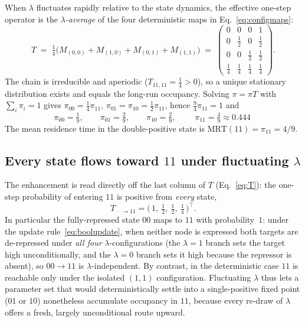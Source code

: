 \documentclass[11pt]{article}
\makeatletter
\providecommand{\DIFaddtex}[1]{{\protect\color{blue}\uwave{#1}}} %
\providecommand{\DIFdeltex}[1]{{\protect\color{red}\sout{#1}}} %
\providecommand{\DIFaddbegin}{} %
\providecommand{\DIFaddend}{} %
\providecommand{\DIFdelbegin}{} %
\providecommand{\DIFdelend}{} %
\providecommand{\DIFadd}[1]{\texorpdfstring{\DIFaddtex{#1}}{#1}} %
\providecommand{\DIFdel}[1]{\texorpdfstring{\DIFdeltex{#1}}{}} %
\providecommand{\DIFscaledelfig}{0.5}
\newlength{\DIFdelgraphicswidth} %
\newlength{\DIFdelgraphicsheight} %
\providecommand{\DIFaddincludegraphics}[2][]{{\color{blue}\fbox{\DIFOincludegraphics[#1]{#2}}}} %
\providecommand{\DIFdelincludegraphics}[2][]{%
\sbox{\DIFdelgraphicsbox}{\DIFOincludegraphics[#1]{#2}}%
\settoboxwidth{\DIFdelgraphicswidth}{\DIFdelgraphicsbox} %
\settoboxtotalheight{\DIFdelgraphicsheight}{\DIFdelgraphicsbox} %
\scalebox{\DIFscaledelfig}{%
\parbox[b]{\DIFdelgraphicswidth}{\usebox{\DIFdelgraphicsbox}\\[-\baselineskip] \rule{\DIFdelgraphicswidth}{0em}}\llap{\resizebox{\DIFdelgraphicswidth}{\DIFdelgraphicsheight}{%
\setlength{\unitlength}{\DIFdelgraphicswidth}%
\begin{picture}(1,1)%
\thicklines\linethickness{2pt} %
{\color[rgb]{1,0,0}\put(0,0){\framebox(1,1){}}}%
{\color[rgb]{1,0,0}\put(0,0){\line( 1,1){1}}}%
{\color[rgb]{1,0,0}\put(0,1){\line(1,-1){1}}}%
\end{picture}%
}\hspace*{3pt}}} %
} %
\DeclareRobustCommand{\DIFaddbegin}{\DIFOaddbegin \let\includegraphics\DIFaddincludegraphics} %
\DeclareRobustCommand{\DIFaddend}{\DIFOaddend \let\includegraphics\DIFOincludegraphics} %
\DeclareRobustCommand{\DIFdelbegin}{\DIFOdelbegin \let\includegraphics\DIFdelincludegraphics} %
\DeclareRobustCommand{\DIFdelend}{\DIFOaddend \let\includegraphics\DIFOincludegraphics} %
\let\sout@orig\sout %
\renewcommand{\sout}[1]{\ifmmode\text{\sout@orig{\ensuremath{#1}}}\else\sout@orig{#1}\fi} %
\makeatother
\begin{document}
When $\lambda$ fluctuates rapidly relative to the state dynamics, the effective
one-step operator is the \emph{$\lambda$-average} of the four deterministic maps
in Eq.~\eqref{eq:configmaps}:
\begin{equation}
  T \;=\; \tfrac{1}{4}\bigl(M_{(0,0)}+M_{(1,0)}+M_{(0,1)}+M_{(1,1)}\bigr)
    \;=\;
    \begin{pmatrix}
      0 & 0 & 0 & 1\\[2pt]
      0 & \tfrac{1}{2} & 0 & \tfrac{1}{2}\\[2pt]
      0 & 0 & \tfrac{1}{2} & \tfrac{1}{2}\\[2pt]
      \tfrac{1}{4} & \tfrac{1}{4} & \tfrac{1}{4} & \tfrac{1}{4}
    \end{pmatrix}.
  \label{eq:T}
\end{equation}
The chain is irreducible and aperiodic ($T_{11,11}=\tfrac14>0$), so a unique
stationary distribution exists and equals the long-run occupancy. Solving
$\pi=\pi T$ with $\sum_i\pi_i=1$ gives $\pi_{00}=\tfrac14\pi_{11}$,
$\pi_{01}=\pi_{10}=\tfrac12\pi_{11}$, hence $\tfrac{9}{4}\pi_{11}=1$ and
\begin{equation}
  \pi_{00}=\tfrac{1}{9},\qquad
  \pi_{01}=\tfrac{2}{9},\qquad
  \pi_{10}=\tfrac{2}{9},\qquad
  \boxed{\;\pi_{11}=\tfrac{4}{9}\approx 0.444\;}
  \label{eq:piann}
\end{equation}
The mean residence time in the double-positive state is
\DIFdelbegin \DIFdel{$\mathrm{MRT}(11)=\pi_{11}=4/9$}\DIFdelend \DIFaddbegin \DIFadd{$\mathrm{occupancy}(11)=\pi_{11}=4/9$}\DIFaddend .

\subsection{Every state flows toward $11$ under fluctuating $\lambda$}
\label{sec:column}

The enhancement is read directly off the last column of $T$
(Eq.~\eqref{eq:T}): the one-step probability of entering $11$ is positive from
\emph{every} state,
\begin{equation}
  T_{\,\cdot\,\to 11} = \bigl(\,1,\ \tfrac12,\ \tfrac12,\ \tfrac14\,\bigr)^{\!\top}.
\end{equation}
In particular the fully-repressed state $00$ maps to $11$ with probability~$1$:
under the update rule~\eqref{eq:boolupdate}, when neither node is expressed both
targets are de-repressed under \emph{all four} $\lambda$-configurations (the
$\lambda=1$ branch sets the target high unconditionally, and the $\lambda=0$
branch sets it high because the repressor is absent), so $00\!\to\!11$ is
$\lambda$-independent. By contrast, in the deterministic case $11$ is reachable
only under the isolated $(1,1)$ configuration. Fluctuating $\lambda$ thus lets a
parameter set that would deterministically settle into a single-positive fixed
point ($01$ or $10$) nonetheless accumulate occupancy in $11$, because every
re-draw of $\lambda$ offers a fresh, largely unconditional route upward.
\end{document}
